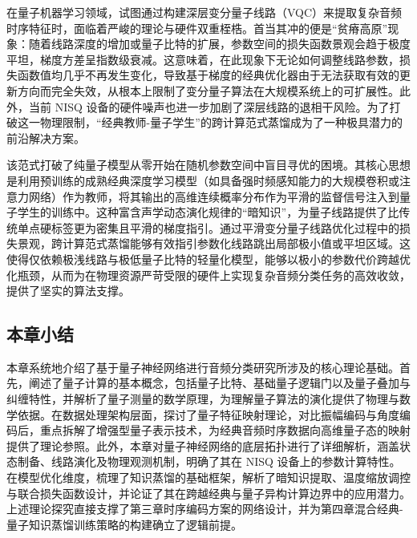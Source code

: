在量子机器学习领域，试图通过构建深层变分量子线路（VQC）来提取复杂音频时序特征时，面临着严峻的理论与硬件双重桎梏。首当其冲的便是“贫瘠高原”现象：随着线路深度的增加或量子比特的扩展，参数空间的损失函数景观会趋于极度平坦，梯度方差呈指数级衰减。这意味着，在此现象下无论如何调整线路参数，损失函数值均几乎不再发生变化，导致基于梯度的经典优化器由于无法获取有效的更新方向而完全失效，从根本上限制了变分量子算法在大规模系统上的可扩展性。此外，当前 NISQ 设备的硬件噪声也进一步加剧了深层线路的退相干风险。为了打破这一物理限制，“经典教师-量子学生”的跨计算范式蒸馏成为了一种极具潜力的前沿解决方案。

该范式打破了纯量子模型从零开始在随机参数空间中盲目寻优的困境。其核心思想是利用预训练的成熟经典深度学习模型（如具备强时频感知能力的大规模卷积或注意力网络）作为教师，将其输出的高维连续概率分布作为平滑的监督信号注入到量子学生的训练中。这种富含声学动态演化规律的“暗知识”，为量子线路提供了比传统单点硬标签更为密集且平滑的梯度指引。通过平滑变分量子线路优化过程中的损失景观，跨计算范式蒸馏能够有效指引参数化线路跳出局部极小值或平坦区域。这使得仅依赖极浅线路与极低量子比特的轻量化模型，能够以极小的参数代价跨越优化瓶颈，从而为在物理资源严苛受限的硬件上实现复杂音频分类任务的高效收敛，提供了坚实的算法支撑。

\subsection{本章小结}
\label{sec:chap2_summary}

本章系统地介绍了基于量子神经网络进行音频分类研究所涉及的核心理论基础。首先，阐述了量子计算的基本概念，包括量子比特、基础量子逻辑门以及量子叠加与纠缠特性，并解析了量子测量的数学原理，为理解量子算法的演化提供了物理与数学依据。在数据处理架构层面，探讨了量子特征映射理论，对比振幅编码与角度编码后，重点拆解了增强型量子表示技术，为经典音频时序数据向高维量子态的映射提供了理论参照。此外，本章对量子神经网络的底层拓扑进行了详细解析，涵盖状态制备、线路演化及物理观测机制，明确了其在 NISQ 设备上的参数计算特性。在模型优化维度，梳理了知识蒸馏的基础框架，解析了暗知识提取、温度缩放调控与联合损失函数设计，并论证了其在跨越经典与量子异构计算边界中的应用潜力。上述理论探究直接支撑了第三章时序编码方案的网络设计，并为第四章混合经典-量子知识蒸馏训练策略的构建确立了逻辑前提。